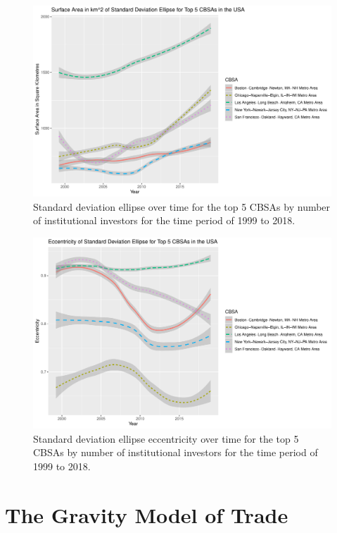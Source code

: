 \begin{figure}
	\centering
	\includegraphics[width=1\linewidth]{Figures/ChapterIII/Standard_Deviation_ellipse}
	\caption[Standard Deviation Ellipse]{Standard deviation ellipse over time for the top 5 CBSAs by number of institutional investors for the time period of 1999 to 2018.}
	\label{fig:standarddeviationellipse}
\end{figure}

\begin{figure}
	\centering
	\includegraphics[width=1\linewidth]{Figures/ChapterIII/Standard_Deviation_ellipse_Eccentricity}
	\caption[Standard Deviation Ellipse Eccentricity]{Standard deviation ellipse eccentricity over time for the top 5 CBSAs by number of institutional investors for the time period of 1999 to 2018.}
	\label{fig:Standard_Deviation_ellipse_Eccentricity}
\end{figure}


\section{The Gravity Model of Trade}


